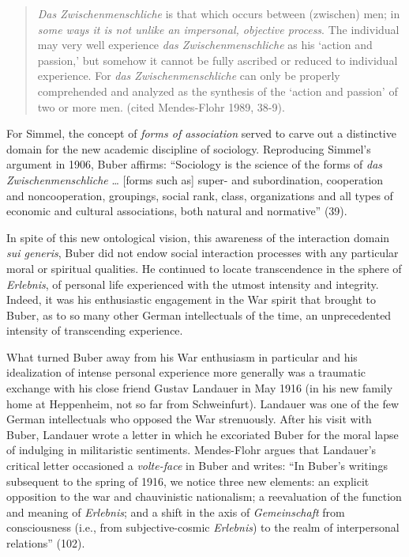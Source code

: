 \begin{quote}
\emph{Das Zwischenmenschliche} is that which occurs between (zwischen) men; in \emph{some ways it is not unlike an impersonal, objective process}. The individual may very well experience \emph{das Zwischenmenschliche} as his `action and passion,' but somehow it cannot be fully ascribed or reduced to individual experience. For \emph{das Zwischenmenschliche} can only be properly comprehended and analyzed as the synthesis of the `action and passion' of two or more men. (cited Mendes-Flohr 1989, 38-9).
\end{quote}

For Simmel, the concept of \emph{forms of association} served to carve out a distinctive domain for the new academic discipline of sociology. Reproducing Simmel's argument in 1906, Buber affirms: ``Sociology is the science of the forms of \emph{das Zwischenmenschliche} \ldots{} [forms such as] super- and subordination, cooperation and noncooperation, groupings, social rank, class, organizations and all types of economic and cultural associations, both natural and normative'' (39).

In spite of this new ontological vision, this awareness of the interaction domain \emph{sui generis}, Buber did not endow social interaction processes with any particular moral or spiritual qualities. He continued to locate transcendence in the sphere of \emph{Erlebnis}, of personal life experienced with the utmost intensity and integrity. Indeed, it was his enthusiastic engagement in the War spirit that brought to Buber, as to so many other German intellectuals of the time, an unprecedented intensity of transcending experience.

What turned Buber away from his War enthusiasm in particular and his idealization of intense personal experience more generally was a traumatic exchange with his close friend Gustav Landauer in May 1916 (in his new family home at Heppenheim, not so far from Schweinfurt). Landauer was one of the few German intellectuals who opposed the War strenuously. After his visit with Buber, Landauer wrote a letter in which he excoriated Buber for the moral lapse of indulging in militaristic sentiments. Mendes-Flohr argues that Landauer's critical letter occasioned a \emph{volte-face} in Buber and writes: ``In Buber's writings subsequent to the spring of 1916, we notice three new elements: an explicit opposition to the war and chauvinistic nationalism; a reevaluation of the function and meaning of \emph{Erlebnis}; and a shift in the axis of \emph{Gemeinschaft} from consciousness (i.e., from subjective-cosmic \emph{Erlebnis}) to the realm of interpersonal relations'' (102).

